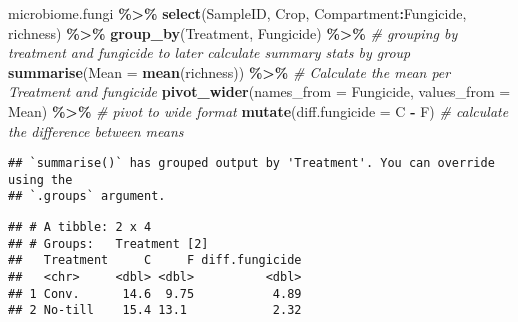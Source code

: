 \documentclass[
]{article}
\newenvironment{Shaded}{\begin{snugshade}}{\end{snugshade}}
\newcommand{\AttributeTok}[1]{\textcolor[rgb]{0.13,0.29,0.53}{#1}}
\newcommand{\CommentTok}[1]{\textcolor[rgb]{0.56,0.35,0.01}{\textit{#1}}}
\newcommand{\FunctionTok}[1]{\textcolor[rgb]{0.13,0.29,0.53}{\textbf{#1}}}
\newcommand{\NormalTok}[1]{#1}
\newcommand{\SpecialCharTok}[1]{\textcolor[rgb]{0.81,0.36,0.00}{\textbf{#1}}}
\begin{document}
\begin{Shaded}
\begin{Highlighting}[]
\NormalTok{microbiome.fungi }\SpecialCharTok{\%\textgreater{}\%}
  \FunctionTok{select}\NormalTok{(SampleID, Crop, Compartment}\SpecialCharTok{:}\NormalTok{Fungicide, richness) }\SpecialCharTok{\%\textgreater{}\%}
   \FunctionTok{group\_by}\NormalTok{(Treatment, Fungicide) }\SpecialCharTok{\%\textgreater{}\%}  \CommentTok{\# grouping by treatment and fungicide to later calculate summary stats by group}
  \FunctionTok{summarise}\NormalTok{(}\AttributeTok{Mean =} \FunctionTok{mean}\NormalTok{(richness)) }\SpecialCharTok{\%\textgreater{}\%}  \CommentTok{\# Calculate the mean per Treatment and fungicide}
  \FunctionTok{pivot\_wider}\NormalTok{(}\AttributeTok{names\_from =}\NormalTok{ Fungicide, }\AttributeTok{values\_from =}\NormalTok{ Mean) }\SpecialCharTok{\%\textgreater{}\%} \CommentTok{\# pivot to wide format}
  \FunctionTok{mutate}\NormalTok{(}\AttributeTok{diff.fungicide =}\NormalTok{ C }\SpecialCharTok{{-}}\NormalTok{ F) }\CommentTok{\# calculate the difference between means}
\end{Highlighting}
\end{Shaded}

\begin{verbatim}
## `summarise()` has grouped output by 'Treatment'. You can override using the
## `.groups` argument.
\end{verbatim}

\begin{verbatim}
## # A tibble: 2 x 4
## # Groups:   Treatment [2]
##   Treatment     C     F diff.fungicide
##   <chr>     <dbl> <dbl>          <dbl>
## 1 Conv.      14.6  9.75           4.89
## 2 No-till    15.4 13.1            2.32
\end{verbatim}
\end{document}
